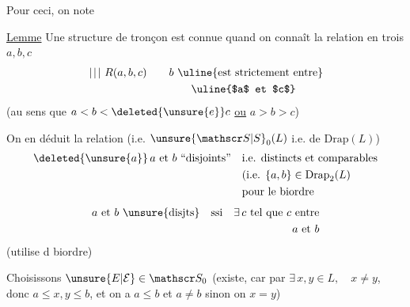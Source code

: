 Pour ceci, on note 

\uline{Lemme} Une structure de  tronçon  est connue quand on connaît la relation en  trois  $a,b,c$
\[
\begin{aligned}
\left.\vphantom{\substack{X\\X}}\right|\!\left.\vphantom{\substack{X\\X}}\right|\!\left.\vphantom{\substack{X\\X}}\right|\, R(a,b,c)
&\qquad b\ \text{\uline{est strictement entre}}\\
&\qquad\qquad\text{\uline{$a$ et $c$}}
\end{aligned}
\]
(au sens que $a<b<\deleted{\unsure{e}}c$ \uline{ou} $a>b>c$)

\uline{}  On en déduit la relation (i.e.  $\unsure{\mathscr S|S}_0(L)$\deleted{\unsure{)}} i.e. de $\mathrm{Drap}(L)$)
\[
\begin{aligned}
\deleted{\unsure{a}}\,a\text{ et }b\ \text{``disjoints''}\quad&
\text{i.e. distincts et comparables}\\
&\text{(i.e. }\{a,b\}\in\mathrm{Drap}_2(L)\\
&\text{pour le biordre}
\end{aligned}
\]
\[
\begin{aligned}
a\text{ et }b\ \text{\unsure{disjts}}\quad \text{ssi}\quad
\exists\,c\ \text{tel que }c\text{ entre}\\
a\text{ et }b
\end{aligned}
\]
(utilise  d  biordre)

 Choisissons $\unsure{E|\mathcal E}\in\mathscr S_0$ (existe, car  par  $\exists\,x,y\in L,\quad x\ne y$, donc $a\leq x,y\leq b$, et on a $a\leq b$ et $a\ne b$ \deleted{\unsure{)}}  sinon on  $x=y$)
